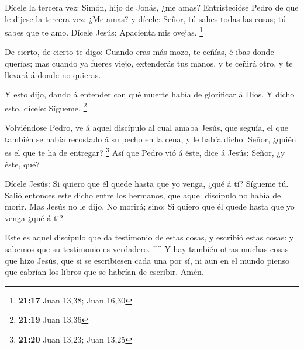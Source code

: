  Dícele la tercera vez: Simón, hijo de Jonás, ¿me amas?
Entristecióse Pedro de que le dijese la tercera vez: ¿Me amas? y dícele:
Señor, tú sabes todas las cosas; tú sabes que te amo. Dícele Jesús:
Apacienta mis ovejas. \footnote{\textbf{21:17} Juan 13,38; Juan 16,30}

 De cierto, de cierto te digo: Cuando eras más mozo, te
ceñías, é ibas donde querías; mas cuando ya fueres viejo, extenderás tus
manos, y te ceñirá otro, y te llevará á donde no quieras.

 Y esto dijo, dando á entender con qué muerte había de
glorificar á Dios. Y dicho esto, dícele: Sígueme. \footnote{\textbf{21:19}
  Juan 13,36}

 Volviéndose Pedro, ve á aquel discípulo al cual amaba
Jesús, que seguía, el que también se había recostado á su pecho en la
cena, y le había dicho: Señor, ¿quién es el que te ha de entregar?
\footnote{\textbf{21:20} Juan 13,23; Juan 13,25}  Así que
Pedro vió á éste, dice á Jesús: Señor, ¿y éste, qué?

 Dícele Jesús: Si quiero que él quede hasta que yo venga,
¿qué á tí? Sígueme tú.  Salió entonces este dicho entre los
hermanos, que aquel discípulo no había de morir. Mas Jesús no le dijo,
No morirá; sino: Si quiero que él quede hasta que yo venga ¿qué á ti?

 Este es aquel discípulo que da testimonio de estas cosas,
y escribió estas cosas: y sabemos que su testimonio es verdadero.
\^{}\^{}  Y hay también otras muchas cosas que hizo Jesús,
que si se escribiesen cada una por sí, ni aun en el mundo pienso que
cabrían los libros que se habrían de escribir. Amén.

